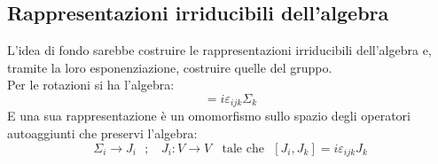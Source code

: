 \documentclass[twoside]{article}
\begin{document}
\vspace{0.5cm}
\subsection{Rappresentazioni irriducibili dell'algebra}

L'idea di fondo sarebbe costruire le rappresentazioni irriducibili dell'algebra e, tramite la loro esponenziazione, costruire quelle del gruppo.
\\
Per le rotazioni si ha l'algebra:
\begin{equation}
     [\Sigma_i,\Sigma_j]=i\varepsilon_{ijk}\Sigma_k
\end{equation}
E una sua rappresentazione è un omomorfismo sullo spazio degli operatori autoaggiunti che preservi l'algebra:
\begin{equation}\label{alg}
    \Sigma_i \to J_i \ \ \ ; \ \ \ \ J_i:V\to V \ \ \ \ \text{tale che} \ \ \ [J_i,J_k]=i \varepsilon_{ijk}J_k
\end{equation}
\end{document}
